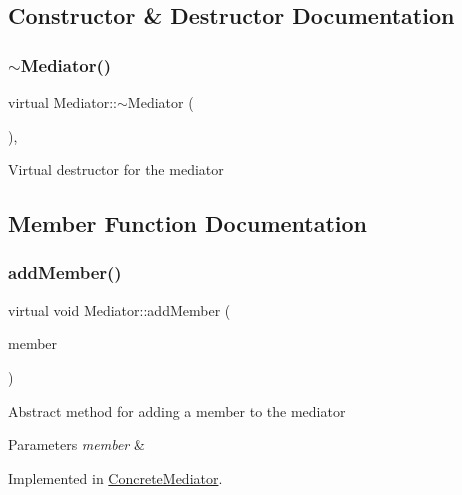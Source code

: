 \subsection{Constructor \& Destructor Documentation}
\mbox{\label{class_mediator_a445a0fa333ce54ec836e3c8a04276272}} 
\subsubsection{\texorpdfstring{$\sim$\+Mediator()}{~Mediator()}}
{\footnotesize\ttfamily virtual Mediator\+::$\sim$\+Mediator (\begin{DoxyParamCaption}{ }\end{DoxyParamCaption})\hspace{0.3cm}{\ttfamily [inline]}, {\ttfamily [virtual]}}

Virtual destructor for the mediator 

\subsection{Member Function Documentation}
\mbox{\label{class_mediator_af3c7f586db4b837962101612555caf6f}} 
\subsubsection{\texorpdfstring{add\+Member()}{addMember()}}
{\footnotesize\ttfamily virtual void Mediator\+::add\+Member (\begin{DoxyParamCaption}\item[{\mbox{\hyperlink{class_pit_crew}{Pit\+Crew}} $\ast$}]{member }\end{DoxyParamCaption})\hspace{0.3cm}{\ttfamily [pure virtual]}}

Abstract method for adding a member to the mediator 
\begin{DoxyParams}{Parameters}
{\em member} & \\
\hline
\end{DoxyParams}


Implemented in \mbox{\hyperlink{class_concrete_mediator_a81de115027a7180658925a2d2175e08f}{Concrete\+Mediator}}.

